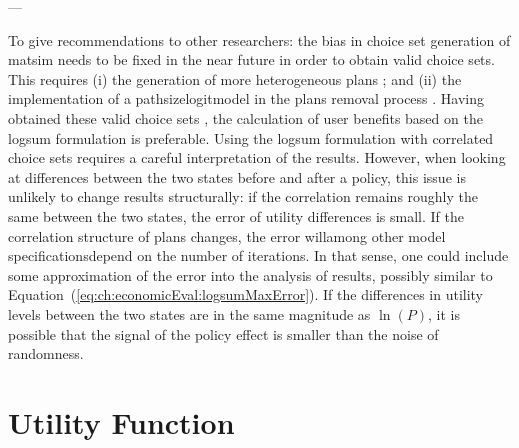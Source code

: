 ---

To give recommendations to other researchers: the bias in choice set generation of \gls{matsim} needs to be fixed in the near future in order to obtain valid choice sets.
%
This requires (i) the generation of more heterogeneous plans \citep[see, e.g.,][for such attempts in the \acrshort{pt} and in the car mode, respectively]{Moyo2013PhD, NagelKickhoeferJoubert2014HeterogeneousVoTsPROCEDIA}; and (ii) the implementation of a \gls{pathsizelogitmodel} in the plans removal process \citep[see, e.g.,][]{Grether2014PhD}.
%
Having obtained these valid choice sets \citep{NagelFloetteroed2009IatbrResourceInBook}, the calculation of user benefits based on the \gls{logsum} formulation is preferable.
%
%
Using the logsum formulation with correlated choice sets requires a careful interpretation of the results. However, when looking at differences between the two states before and after a policy, this issue is unlikely to change results structurally: if the correlation remains roughly the same between the two states, the error of utility differences is small. If the correlation structure of plans changes, the error will\textemdash among other model specifications\textemdash depend on the number of iterations.
%
%
In that sense, one could include some approximation of the error into the analysis of results, possibly similar to Equation~(\ref{eq:ch:economicEval:logsumMaxError}). If the differences in utility levels between the two states are in the same magnitude as $\ln(P)$, it is possible that the signal of the policy effect is smaller than the noise of randomness.

\section{Utility Function}
\label{sec:future-of-scoring-function}

